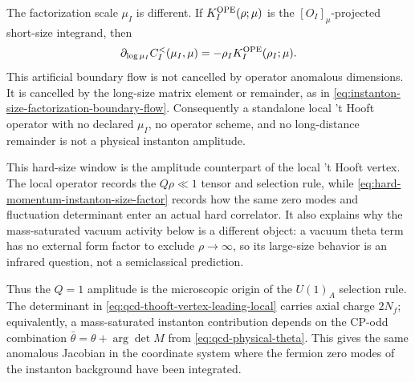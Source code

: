 \begin{controlledapproximation}
The factorization scale \(\mu_I\) is different.  If
\(K_I^{\rm OPE}(\rho;\mu)\) is the \([O_I]_\mu\)-projected short-size
integrand, then
\begin{equation}
  \partial_{\log\mu_I}C_I^{<}(\mu_I,\mu)
  =
  -\rho_I K_I^{\rm OPE}(\rho_I;\mu).
  \label{eq:short-instanton-coefficient-factorization-flow}
\end{equation}
This artificial boundary flow is not cancelled by operator anomalous
dimensions.  It is cancelled by the long-size matrix element or remainder, as
in \eqref{eq:instanton-size-factorization-boundary-flow}.  Consequently a
standalone local 't Hooft operator with no declared \(\mu_I\), no operator
scheme, and no long-distance remainder is not a physical instanton amplitude.
\end{controlledapproximation}

This hard-size window is the amplitude counterpart of the local
't Hooft vertex.  The local operator records the \(Q\rho\ll1\) tensor and
selection rule, while \eqref{eq:hard-momentum-instanton-size-factor} records
how the same zero modes and fluctuation determinant enter an actual hard
correlator.  It also explains why the mass-saturated vacuum activity below is
a different object: a vacuum theta term has no external form factor to
exclude \(\rho\to\infty\), so its large-size behavior is an infrared
question, not a semiclassical prediction.

Thus the \(Q=1\) amplitude is the microscopic origin of the \(U(1)_A\)
selection rule.  The determinant in
\eqref{eq:qcd-thooft-vertex-leading-local} carries axial charge \(2N_f\);
equivalently, a mass-saturated instanton contribution depends on the CP-odd
combination \(\bar\theta=\theta+\arg\det M\) from
\eqref{eq:qcd-physical-theta}.  This gives the same anomalous Jacobian in the
coordinate system where the fermion zero modes of the instanton background
have been integrated.

